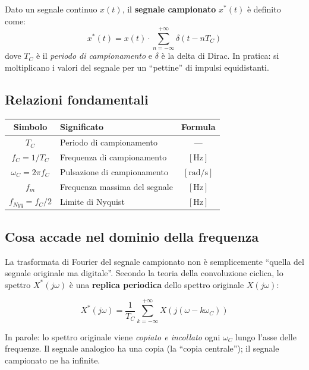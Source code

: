 \documentclass[12pt,a4paper]{article}
\begin{document}
Dato un segnale continuo $x(t)$, il \textbf{segnale campionato} $x^*(t)$ è definito come:
\begin{equation}
  x^*(t) = x(t) \cdot \sum_{n=-\infty}^{+\infty} \delta(t - n T_C)
\end{equation}
dove $T_C$ è il \textit{periodo di campionamento} e $\delta$ è la delta di Dirac.
In pratica: si moltiplicano i valori del segnale per un ``pettine'' di impulsi equidistanti.

\subsection{Relazioni fondamentali}

\begin{center}
\renewcommand{\arraystretch}{1.5}
\begin{tabular}{>{\bfseries}c p{7cm} c}
\toprule
Simbolo & Significato & Formula \\
\midrule
$T_C$ & Periodo di campionamento & --- \\
$f_C = 1/T_C$ & Frequenza di campionamento & $[\text{Hz}]$ \\
$\omega_C = 2\pi f_C$ & Pulsazione di campionamento & $[\text{rad/s}]$ \\
$f_m$ & Frequenza massima del segnale & $[\text{Hz}]$ \\
$f_{Nyq} = f_C / 2$ & Limite di Nyquist & $[\text{Hz}]$ \\
\bottomrule
\end{tabular}
\end{center}

\subsection{Cosa accade nel dominio della frequenza}

La trasformata di Fourier del segnale campionato non è semplicemente ``quella del segnale originale
ma digitale''. Secondo la teoria della convoluzione ciclica, lo spettro $X^*(j\omega)$ è una
\textbf{replica periodica} dello spettro originale $X(j\omega)$:

\begin{equation}
  X^*(j\omega) = \frac{1}{T_C} \sum_{k=-\infty}^{+\infty} X\!\left(j\left(\omega - k\omega_C\right)\right)
\end{equation}

In parole: lo spettro originale viene \textit{copiato e incollato} ogni $\omega_C$ lungo l'asse delle
frequenze. Il segnale analogico ha una copia (la ``copia centrale''); il segnale campionato ne ha
infinite.
\end{document}

